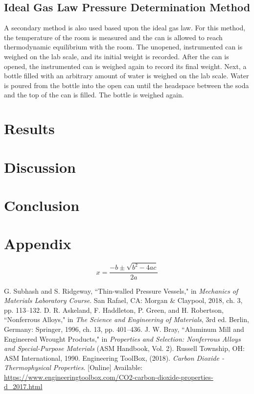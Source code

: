 \documentclass[10pt,journal,letterpaper]{IEEEtran}
\begin{document}
\subsection{Ideal Gas Law Pressure Determination Method}

A secondary method is also used based upon the ideal gas law.
For this method, the temperature of the room is measured and the can is allowed to reach thermodynamic equilibrium with the room.
The unopened, instrumented can is weighed on the lab scale, and its initial weight is recorded.
After the can is opened, the instrumented can is weighed again to record its final weight.
Next, a bottle filled with an arbitrary amount of water is weighed on the lab scale.
Water is poured from the bottle into the open can until the headspace between the soda and the top of the can is filled.
The bottle is weighed again.

\section{Results}

\lipsum[9-10]

\section{Discussion}

\lipsum[11-20]

\section{Conclusion}

\lipsum[21]

\section*{Appendix}

\lipsum[22-24]
\begin{equation}
x=\frac{-b\pm\sqrt{b^2-4ac}}{2a}
\end{equation}
\lipsum[25]


\begin{thebibliography}{00}
 G. Subhash and S. Ridgeway, ``Thin-walled Pressure Vessels," in \textit{Mechanics of Materials Laboratory Course}. San Rafael, CA: Morgan \& Claypool, 2018, ch. 3, pp. 113--132.
 D. R. Askeland, F. Haddleton, P. Green, and H. Robertson, ``Nonferrous Alloys," in \textit{The Science and Engineering of Materials}, 3rd ed. Berlin, Germany: Springer, 1996, ch. 13, pp. 401--436.
 J. W. Bray, ``Aluminum Mill and Engineered Wrought Products," in \textit{Properties and Selection: Nonferrous Alloys and Special-Purpose Materials} (ASM Handbook, Vol. 2). Russell Township, OH: ASM International, 1990.
 Engineering ToolBox, (2018). \textit{Carbon Dioxide - Thermophysical Properties}. [Online] Available: \url{https://www.engineeringtoolbox.com/CO2-carbon-dioxide-properties-d_2017.html}
\end{thebibliography}
\end{document}
